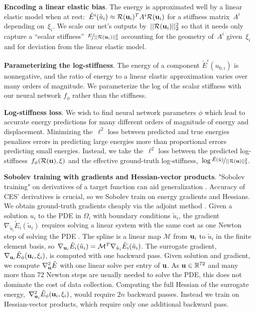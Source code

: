 \textbf{Encoding a linear elastic bias}.
The energy is approximated well by a linear elastic model when at rest:~${\tilde{E}^i(\tilde{u}_i) \approx \mathcal{R}({\mathbf{u}}_i)^T A^i \mathcal{R}({\mathbf{u}}_i)}$ for a stiffness matrix~$A^i$ depending on~$\xi_i$.
We scale our net's outputs by~$||\mathcal{R}({\mathbf{u}}_i)||_2^2$ so that it needs only capture a ``scalar stiffness''~$\nicefrac{E}{||\mathcal{R}({\mathbf{u}}_i)||_2^2}$ accounting for the geometry of~$A^i$ given~$\xi_i$ and for deviation from the linear elastic model.

\textbf{Parameterizing the log-stiffness}.
The energy of a component $\tilde{E}^i(u_{0, i})$ is nonnegative, and the ratio of energy to a linear elastic approximation varies over many orders of magnitude.
We parameterize the log of the scalar stiffness with our neural network $f_\phi$ rather than the stiffness.

\textbf{Log-stiffness loss}. We wish to find neural network parameters $\phi$ which lead to accurate energy predictions for many different orders of magnitude of energy and displacement.
Minimizing the~$\ell^2$ loss between predicted and true energies penalizes errors in predicting large energies more than proportional errors predicting small energies.
Instead, we take the~$\ell^2$ loss between the predicted log-stiffness~$f_\phi (\mathcal{R}({\mathbf{u}}), \xi)$ and the effective ground-truth log-stiffness,~$\log\nicefrac{ \tilde{E}(\tilde{u})}{||\mathcal{R}({\mathbf{u}})||_2^2}$.

\textbf{Sobolev training with gradients and Hessian-vector products}.
"Sobolev training" on derivatives of a target function can aid generalization \citep{czarnecki2017sobolev}.
Accuracy of CES' derivatives is crucial, so we Sobolev train on energy gradients and Hessians.
We obtain ground-truth gradients cheaply via the adjoint method \citep{lions1971optimal}. Given a solution $u_i$ to the PDE in $\Omega_i$ with boundary conditions $\tilde{u}_i$, the gradient~${\nabla_{\tilde{u}_i} \tilde{E}_i(\tilde{u}_i)}$ requires solving a linear system with the same cost as one Newton step of solving the PDE \citep{mitusch2019dolfin}.
The spline is a linear map $\mathcal{M}$ from ${\mathbf{u}}_i$ to $\tilde{u}_i$ in the finite element basis, so~${\nabla_{{\mathbf{u}}_i} \tilde{E}_i(\tilde{u}_i) = \mathcal{M}^T \nabla_{\tilde{u}_i} \tilde{E}_i(\tilde{u}_i)}$. The surrogate gradient,~${\nabla_{{\mathbf{u}}_i} \hat{E}_\phi({\mathbf{u}}_i, \xi_i)}$,
is computed with one backward pass. Given solution and gradient, we compute $\nabla^2_{{\mathbf{u}}}\tilde{E}$
with one linear solve per entry of ${\mathbf{u}}$. As ${\mathbf{u}} \in \mathbb{R}^{72}$ and many more than 72 Newton steps are usually needed to solve the PDE, this does not dominate the cost of data collection.
Computing the full Hessian of the surrogate energy,~${\nabla^2_{{\mathbf{u}}_i}\hat{E}_\phi({\mathbf{u}}_i, \xi_i)}$, would require $2n$ backward passes.
Instead we train on Hessian-vector products, which require only one additional backward pass.

